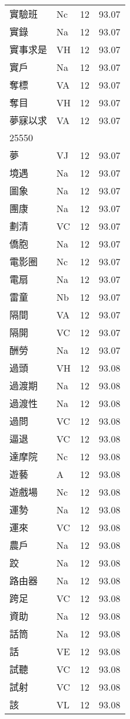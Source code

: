 \documentclass[twocolumn]{book}
\begin{document}
\begin{supertabular}{llrr}
實驗班 & Nc & 12 &  93.07\\
實錄 & Na & 12 &  93.07\\
實事求是 & VH & 12 &  93.07\\
實戶 & Na & 12 &  93.07\\
奪標 & VA & 12 &  93.07\\
奪目 & VH & 12 &  93.07\\
夢寐以求 & VA & 12 &  93.07\\
25550\\
夢 & VJ & 12 &  93.07\\
境遇 & Na & 12 &  93.07\\
圖象 & Na & 12 &  93.07\\
團康 & Na & 12 &  93.07\\
劃清 & VC & 12 &  93.07\\
僑胞 & Na & 12 &  93.07\\
電影圈 & Nc & 12 &  93.07\\
電扇 & Na & 12 &  93.07\\
雷童 & Nb & 12 &  93.07\\
隔間 & VA & 12 &  93.07\\
隔開 & VC & 12 &  93.07\\
酬勞 & Na & 12 &  93.07\\
過頭 & VH & 12 &  93.08\\
過渡期 & Na & 12 &  93.08\\
過渡性 & Na & 12 &  93.08\\
過問 & VC & 12 &  93.08\\
逼退 & VC & 12 &  93.08\\
達摩院 & Nc & 12 &  93.08\\
遊藝 & A & 12 &  93.08\\
遊戲場 & Nc & 12 &  93.08\\
運勢 & Na & 12 &  93.08\\
運來 & VC & 12 &  93.08\\
農戶 & Na & 12 &  93.08\\
跤 & Na & 12 &  93.08\\
路由器 & Na & 12 &  93.08\\
跨足 & VC & 12 &  93.08\\
資助 & Na & 12 &  93.08\\
話筒 & Na & 12 &  93.08\\
話 & VE & 12 &  93.08\\
試聽 & VC & 12 &  93.08\\
試射 & VC & 12 &  93.08\\
該 & VL & 12 &  93.08\\

\end{supertabular}
\end{document}
